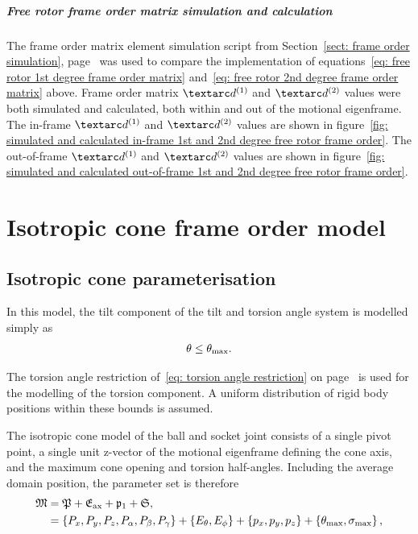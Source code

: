 \subparagraph[Frame order matrix simulation and calculation]{Free rotor frame order matrix simulation and calculation}

The frame order matrix element simulation script from Section~\ref{sect: frame order simulation}, page~\pageref{sect: frame order simulation} was used to compare the implementation of equations~\ref{eq: free rotor 1st degree frame order matrix} and~\ref{eq: free rotor 2nd degree frame order matrix} above.
Frame order matrix $\FOone$ and $\FOtwo$ values were both simulated and calculated, both within and out of the motional eigenframe.
The in-frame $\FOone$ and $\FOtwo$ values are shown in figure~\ref{fig: simulated and calculated in-frame 1st and 2nd degree free rotor frame order}.
The out-of-frame $\FOone$ and $\FOtwo$ values are shown in figure~\ref{fig: simulated and calculated out-of-frame 1st and 2nd degree free rotor frame order}.



\section{Isotropic cone frame order model}






\subsection{Isotropic cone parameterisation}

In this model, the tilt component of the tilt and torsion angle system is modelled simply as
\begin{equation}
    \theta \le \theta_\textrm{max} .
\end{equation}

The torsion angle restriction of~\ref{eq: torsion angle restriction} on page~\pageref{eq: torsion angle restriction} is used for the modelling of the torsion component.
A uniform distribution of rigid body positions within these bounds is assumed.

The isotropic cone model of the ball and socket joint consists of a single pivot point, a single unit z-vector of the motional eigenframe defining the cone axis, and the maximum cone opening and torsion half-angles.
Including the average domain position, the parameter set is therefore
\begin{subequations}
\begin{align}
    \mathfrak{M} &= \mathfrak{P} + \mathfrak{E}_\textrm{ax} + \mathfrak{p}_1 + \mathfrak{S}, \\
              &= \left\{ P_x, P_y, P_z, P_\alpha, P_\beta, P_\gamma \right\} + \left\{ E_\theta, E_\phi \right\} + \left\{ p_x, p_y, p_z \right\} + \left\{ \theta_\textrm{max}, \sigma_\textrm{max} \right\} ,
\end{align}
\end{subequations}

